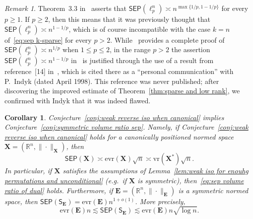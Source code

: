 \documentclass[11pt,reqno]{amsart}
\renewcommand{\le}{\leqslant}
\renewcommand{\ge}{\geqslant}
\newcommand{\vr}{\mathrm{vr}}
\newcommand{\evr}{\mathrm{evr}}
\newcommand{\X}{\mathbf X}
\newcommand{\R}{\mathbb R}
\newtheorem{corollary}[theorem]{Corollary}
\theoremstyle{remark}
\newtheorem{remark}[theorem]{Remark}
\newcommand{\sfS}{\mathsf{S}}
\renewcommand{\1}{\mathbf 1}
\newcommand{\sep}{\mathsf{SEP}}
\newcommand{\bfE}{\mathbf{E}}
\begin{document}
\begin{remark}\label{rem:explain indyk}
Theorem~3.3  in~\cite{CCGGP98} asserts that $\sep(\ell_p^n)\asymp n^{\max\{1/p,1-1/p\}}$ for every $p\ge 1$. If $p\ge 2$, then this means that it was previously thought that $\sep(\ell_p^n)\asymp n^{1-1/p}$, which   is  of course incompatible with the case $k=n$ of~\eqref{eq:sep k-sparse} for every $p>2$. While~\cite{CCGGP98}  provides a complete proof of $\sep(\ell_p^n)\asymp n^{1/p}$ when $1\le p\le 2$, in the range $p>2$ the assertion $\sep(\ell_p^n)\asymp n^{1-1/p}$ in~\cite{CCGGP98}  is justified through the use of a result from reference~[14] in~\cite{CCGGP98}, which is cited there as a  ``personal communication'' with P.~Indyk (dated April 1998). This reference was never published; after discovering the improved estimate of Theorem~\ref{thm:sparse and low rank},  we confirmed with Indyk that it was indeed flawed.
\end{remark}






























\begin{corollary}\label{cor:sep sharp if conj} Conjecture~\ref{conj:weak reverse iso when canonical}  implies  Conjecture~\ref{conj:symmetric volume ratio sep}. Namely, if   Conjecture~\ref{conj:weak reverse iso when canonical} holds for a canonically positioned normed space $\X=(\R^n,\|\cdot\|_\X)$, then \begin{equation}\label{eq:sep volume ratio of dual}
\sep(\X)\asymp \evr(\X)\sqrt{n}\asymp \vr(\X^*)\sqrt{n}.
\end{equation}
In particular, if $\X$ satisfies the assumptions of Lemma~\ref{lem:weak iso for enouhg permutations and unconditional} (e.g.~if $\X$ is symmetric), then~\eqref{eq:sep volume ratio of dual} holds.  Furthermore, if $\bfE=(\R^n,\|\cdot\|_\bfE)$ is a symmetric normed space, then $\sep(\sfS_\bfE)=\evr(\bfE)n^{1+o(1)}$. More precisely,
\begin{equation}\label{eq:sep of ideal intro}
\evr(\bfE)n\lesssim \sep(\sfS_\bfE)\lesssim \evr(\bfE)n\sqrt{\log n}.
\end{equation}
\end{corollary}
\end{document}
